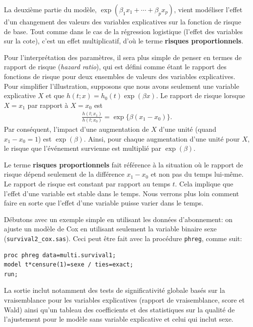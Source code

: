 \documentclass[
  11pt,
  letterpaper,
]{book}
\theoremstyle{definition}
\theoremstyle{definition}
\theoremstyle{definition}
\theoremstyle{remark}
\begin{document}
La deuxième partie du modèle, \(\exp(\beta_1x_1 + \cdots + \beta_p x_p)\), vient modéliser l'effet d'un changement des valeurs des variables explicatives sur la fonction de risque de base. Tout comme dans le cas de la régression logistique (l'effet des variables sur la cote), c'est un effet multiplicatif, d'où le terme \textbf{risques proportionnels}.

Pour l'interprétation des paramètres, il sera plus simple de penser en termes de rapport de risque (\emph{hazard ratio}), qui est défini comme étant le rapport des fonctions de risque pour deux ensembles de valeurs des variables explicatives. Pour simplifier l'illustration, supposons que nous avons seulement une variable explicative \(X\) et que \(h(t; x) = h_0(t)\exp(\beta x)\). Le rapport de risque lorsque \(X=x_1\) par rapport à \(X=x_0\) est
\begin{align*}
\frac{h(t; x_1)}{h(t; x_0)} = \exp\{\beta(x_1-x_0)\}.
\end{align*}
Par conséquent, l'impact d'une augmentation de \(X\) d'une unité (quand \(x_1-x_0=1\)) est \(\exp(\beta)\). Ainsi, pour chaque augmentation d'une unité pour \(X\), le risque que l'événement survienne est multiplié par \(\exp(\beta)\).

Le terme \textbf{risques proportionnels} fait référence à la situation où le rapport de risque dépend seulement de la différence \(x_1-x_0\) et non pas du temps lui-même. Le rapport de risque est constant par rapport au temps \(t\). Cela implique que l'effet d'une variable est stable dans le temps. Nous verrons plus loin comment faire en sorte que l'effet d'une variable puisse varier dans le temps.

Débutons avec un exemple simple en utilisant les données d'abonnement: on ajuste un modèle de Cox en utilisant seulement la variable binaire sexe (\texttt{survival2\_cox.sas}). Ceci peut être fait avec la procédure \texttt{phreg}, comme suit:

\begin{verbatim}
proc phreg data=multi.survival1;
model t*censure(1)=sexe / ties=exact; 
run;
\end{verbatim}

La sortie inclut notamment des tests de significativité globale basés sur la vraisemblance pour les variables explicatives (rapport de vraisemblance, score et Wald) ainsi qu'un tableau des coefficients et des statistiques sur la qualité de l'ajustement pour le modèle sans variable explicative et celui qui inclut sexe.
\end{document}
